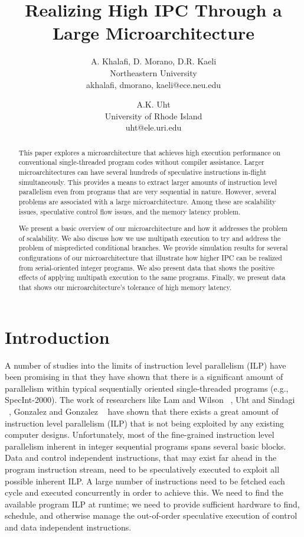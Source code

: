 \documentclass[10pt,dvips]{article}
\begin{document}
\parskip 3mm
%
%
\title{Realizing High IPC Through a Large Microarchitecture}
%
\author{
A. Khalafi, D. Morano, D.R. Kaeli\\
Northeastern University\\
{akhalafi, dmorano, kaeli}@ece.neu.edu\\
\and
A.K. Uht \\
University of Rhode Island\\ uht@ele.uri.edu
}
%
\maketitle
\thispagestyle{empty}
%
\begin{abstract}
This paper explores a microarchitecture that achieves high execution
performance on conventional single-threaded program codes without
compiler assistance.  Larger microarchitectures can have several
hundreds of speculative instructions in-flight simultaneously.  This
provides a means to extract larger amounts of instruction level
parallelism even from programs that are very sequential in nature.
However, several problems are associated with a large
microarchitecture.  Among these are scalability issues, speculative
control flow issues, and the memory latency problem.

We present a basic overview of our microarchitecture and how it
addresses the problem of scalability.  We also discuss how we use
multipath execution to try and address the problem of mispredicted
conditional branches.  We provide simulation results for several
configurations of our microarchitecture that illustrate how higher IPC
can be realized from serial-oriented integer programs.  We also present
data that shows the positive effects of applying multipath execution to
the same programs.  Finally, we present data that shows our
microarchitecture's tolerance of high memory latency.
\end{abstract}
%
\section{Introduction}
%
A number of studies into the limits of instruction level 
parallelism (ILP) have
been promising in that they have shown that there is 
a significant amount of parallelism within
typical sequentially oriented single-threaded programs
(e.g., SpecInt-2000).  
The work of researchers like
Lam and Wilson ~\cite{Lam92},
Uht and Sindagi ~\cite{Uht95},
Gonzalez and Gonzalez ~\cite{Gon97}
have shown that there exists a great amount of instruction level
parallelism (ILP) that is not being exploited by any existing
computer designs.
Unfortunately, most of the fine-grained instruction level
parallelism inherent in integer sequential programs
spans several basic blocks.  
Data and control independent instructions, that may exist
far ahead in the program instruction stream, need to be
speculatively executed to exploit all possible inherent
ILP.
A large number of instructions need to be fetched
each cycle and executed concurrently in order to achieve this.
We need to find the available program ILP at runtime; we need to 
provide sufficient hardware to find, schedule,
and otherwise manage the out-of-order speculative execution of
control and data independent instructions.
\end{document}
